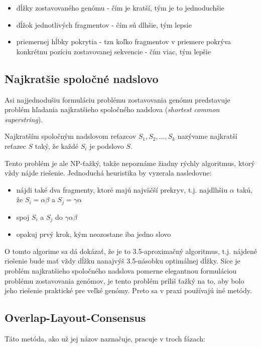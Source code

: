     \begin{itemize}
        \item dĺžky zostavovaného genómu - čím je kratší, tým je to jednoduchšie
        \item dĺžok jednotlivých fragmentov - čím sú dlhšie, tým lepsie
        \item priemernej hĺbky pokrytia - tzn koľko fragmentov v priemere
        pokrýva konkrétnu pozíciu zostavovanej sekvencie - čím viac, tým lepšie
    \end{itemize}

    \subsection{Najkratšie spoločné nadslovo}
    Asi najjednodušiu formuláciu problému zostavovania genómu predstavuje
    problém hľadania najkratšieho spoločného nadslova (\emph{shortest common
    superstring}).
    
    \begin{defn}
        Najkratším spoločným nadslovom reťazcov $S_1, S_2, \ldots, S_k$ nazývame
        najkratší reťazec $S$ taký, že každé $S_i$ je podslovo $S$.
    \end{defn}
    
    Tento problém je ale NP-ťažký, takže nepoznáme žiadny rýchly algoritmus,
    ktorý vždy nájde riešenie. Jednoduchá heuristika by vyzerala nasledovne:
    
    \begin{itemize}
        \item nájdi také dva fragmenty, ktoré majú najväčší prekryv, t.j.
        najdlhšiu $\alpha$ takú, že $S_i = \alpha\beta$ a $S_j = \gamma\alpha$
        \item spoj $S_i$ a $S_j$ do $\gamma\alpha\beta$
        \item opakuj prvý krok, kým neozostane iba jedno slovo
    \end{itemize}
    
    O tomto algorime sa dá dokázať, že je to 3.5-aproximačný algoritmus, t.j.
    nájdené riešenie bude mať vždy dĺžku nanajvýš 3.5-násobku optimálnej dĺžky.
    Síce je problém najkratšieho spoločného nadslova pomerne elegantnou
    formuláciou problému zostavovania genómov, je tento problém príliš ťažký na
    to, aby bolo jeho riešenie praktické pre veľké genómy. Preto sa v praxi
    používajú iné metódy.

    \subsection{Overlap-Layout-Consensus}
    Táto metóda, ako už jej názov naznačuje, pracuje v troch fázach:
    

